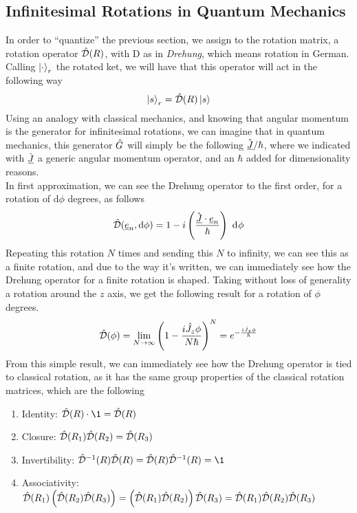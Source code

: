 \documentclass[../qm.tex]{subfiles}
\begin{document}
	\subsection{Infinitesimal Rotations in Quantum Mechanics}
	In order to ``quantize'' the previous section, we assign to the rotation matrix, a rotation operator $\hat{\mathcal{D}}(R)$, with D as in \textit{Drehung}, which means rotation in German.\\
	Calling $\ket{\cdot}_r$ the rotated ket, we will have that this operator will act in the following way
	\begin{equation}
		\ket{s}_r=\hat{\mathcal{D}}(R)\ket{s}
		\label{eq:drehungop}
	\end{equation}
	Using an analogy with classical mechanics, and knowing that angular momentum is the generator for infinitesimal rotations, we can imagine that in quantum mechanics, this generator $\hat{G}$ will simply be the following $\hat{\underline{J}}/\hbar$, where we indicated with $\hat{\underline{J}}$ a generic angular momentum operator, and an $\hbar$ added for dimensionality reasons.\\
	In first approximation, we can see the Drehung operator to the first order, for a rotation of $\mathrm{d}\phi$ degrees, as follows
	\begin{equation*}
		\hat{\mathcal{D}}(\underline{e}_{n},\mathrm{d}\phi)=1-i\left( \frac{\hat{\underline{J}}\cdot\underline{e}_{n}}{\hbar} \right)\ \mathrm{d}^{}\phi
	\end{equation*}
	Repeating this rotation $N$ times and sending this $N$ to infinity, we can see this as a finite rotation, and due to the way it's written, we can immediately see how the Drehung operator for a finite rotation is shaped. Taking without loss of generality a rotation around the $z$ axis, we get the following result for a rotation of $\phi$ degrees.
	\begin{equation}
		\hat{\mathcal{D}}(\phi)=\lim_{N\to\infty}\left( 1-\frac{i\hat{J}_z\phi}{N\hbar} \right)^N=e^{-\frac{i\hat{J}_z\phi}{\hbar}}
		\label{eq:finitedrehungop}
	\end{equation}
	From this simple result, we can immediately see how the Drehung operator is tied to classical rotation, as it has the same group properties of the classical rotation matrices, which are the following
	\begin{enumerate}
	\item Identity: $\opr{\mc{D}}(R)\cdot\1=\opr{\mc{D}}(R)$
	\item Closure: $\hat{\mathcal{D}}(R_1)\hat{\mathcal{D}}(R_2)=\hat{\mathcal{D}}(R_3)$
	\item Invertibility: $\opr{\mc{D}}^{-1}(R)\opr{\mc{D}}(R)=\opr{\mc{D}}(R)\opr{\mc{D}}^{-1}(R)=\1$
	\item Associativity: $\hat{\mathcal{D}}(R_1)\left( \hat{\mathcal{D}}(R_2)\hat{\mathcal{D}}(R_3) \right)=\left( \hat{\mathcal{D}}(R_1)\hat{\mathcal{D}}(R_2) \right)\hat{\mathcal{D}}(R_3)=\hat{\mathcal{D}}(R_1)\hat{\mathcal{D}}(R_2)\hat{\mathcal{D}}(R_3)$
	\end{enumerate}
\end{document}
